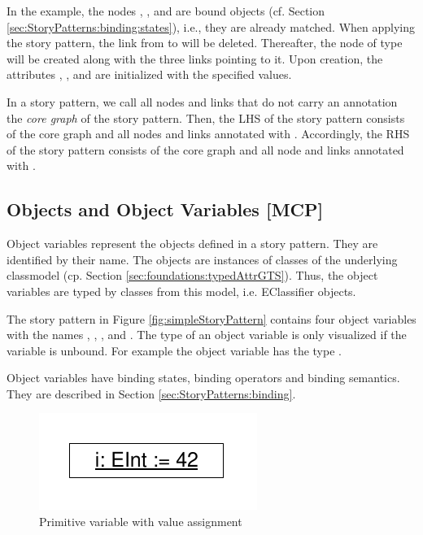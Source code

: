 In the example, the nodes , , and  are bound objects (cf. Section \ref{sec:StoryPatterns:binding:states}), i.e., they are already matched. When applying the story pattern, the link from  to  will be deleted. Thereafter, the node  of type  will be created along with the three links pointing to it. Upon creation, the attributes , , and  are initialized with the specified values.

In a story pattern, we call all nodes and links that do not carry an annotation the \emph{core graph} of the story pattern. Then, the LHS of the story pattern consists of the core graph and all nodes and links annotated with \destroy. Accordingly, the RHS of the story pattern consists of the core graph and all node and links annotated with \create.

\subsection{Objects and Object Variables [MCP]}
\label{sec:StoryPatterns:objects}

Object variables represent the objects defined in a story pattern.
They are identified by their name.
The objects are instances of classes of the underlying classmodel (cp. Section \ref{sec:foundations:typedAttrGTS}).
Thus, the object variables are typed by classes from this model, i.e.
EClassifier objects.

The story pattern in Figure \ref{fig:simpleStoryPattern} contains four
object variables with the names , , , and
. 
The type of an object variable is only visualized if the
variable is unbound. For example the object variable  has the type .

Object variables have binding states, binding operators and binding semantics.
They are described in Section  \ref{sec:StoryPatterns:binding}.


\begin{figure}[htbp]
  \centering
  \includegraphics[scale=0.6]{figures/PrimitiveVariable}
  \caption{Primitive variable with value assignment}
  \label{fig:primitiveVariable}
\end{figure}


